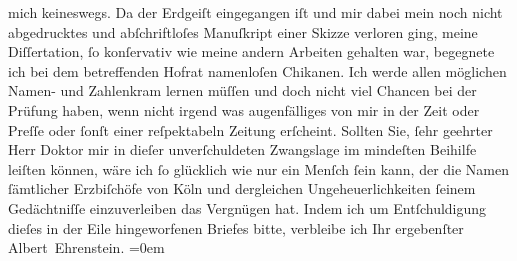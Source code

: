 \begin{ledgroupsized}[t]{13cm}
                    mich keineswegs. Da {\pb}der Erdgeiſt eingegangen iſt und mir dabei mein noch nicht abgedrucktes
                    und abſchriftloſes Manuſkript einer Skizze verloren ging, meine Diſſertation, ſo konſervativ wie meine
                    andern Arbeiten gehalten war, begegnete ich bei dem betreffenden Hofrat namenloſen
                    Chikanen. Ich werde allen möglichen Namen- und Zahlenkram lernen müſſen und doch
                    nicht viel Chancen bei der Prüfung haben, wenn nicht irgend was augenfälliges
                    von mir in der Zeit oder Preſſe oder ſonſt einer reſpektabeln Zeitung erſcheint.
                    Sollten Sie, {\pb}ſehr geehrter Herr Doktor mir in dieſer
                    unverſchuldeten Zwangslage im mindeſten Beihilfe leiſten können, wäre ich ſo
                    glücklich wie nur ein Menſch ſein kann, der die Namen ſämtlicher Erzbiſchöfe von
                        Köln und dergleichen Ungeheuerlichkeiten
                    ſeinem Gedächtniſſe einzuverleiben das Vergnügen hat.\pend
           \pstart
           Indem ich um Entſchuldigung dieſes in der Eile hingeworfenen Briefes bitte,
                    verbleibe ich\pend
           \pstart
           Ihr ergebenſter{\\[\baselineskip]}\spacefill\mbox{Albert Ehrenstein.}\pend
           \leftskip=0em{}\endnumbering{}\end{ledgroupsized}  \newcommand{\dateiname}{L01852}\newcommand{\titel}{Albert Ehrenstein an Arthur Schnitzler, 1. 7. 1909}\newcommand{\editorInnen}{Martin Anton Müller und Gerd-Hermann Susen}
      